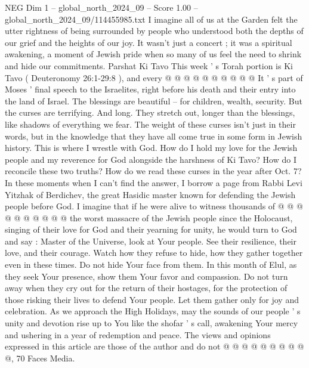 \begin{textsample}{NEG Dim 1 – global\_north\_2024\_09 – Score 1.00 – global\_north\_2024\_09/114455985.txt}
I imagine all of us at the Garden felt the utter rightness of being surrounded by people who understood both the depths of our grief and the heights of our joy.
It wasn't just a concert ; it was a spiritual awakening, a moment of Jewish pride when so many of us feel the need to shrink and hide our commitments.
Parshat Ki Tavo This week ' s Torah portion is Ki Tavo ( Deuteronomy 26:1-29:8 ), and every @ @ @ @ @ @ @ @ @ @ It ' s part of Moses ' final speech to the Israelites, right before his death and their entry into the land of Israel.
The blessings are beautiful -- for children, wealth, security.
But the curses are terrifying.
And long.
They stretch out, longer than the blessings, like shadows of everything we fear.
The weight of these curses isn't just in their words, but in the knowledge that they have all come true in some form in Jewish history.
This is where I wrestle with God.
How do I hold my love for the Jewish people and my reverence for God alongside the harshness of Ki Tavo?
How do I reconcile these two truths?
How do we read these curses in the year after Oct. 7?
In these moments when I can't find the answer, I borrow a page from Rabbi Levi Yitzhak of Berdichev, the great Hasidic master known for defending the Jewish people before God.
I imagine that if he were alive to witness thousands of @ @ @ @ @ @ @ @ @ @ the worst massacre of the Jewish people since the Holocaust, singing of their love for God and their yearning for unity, he would turn to God and say : Master of the Universe, look at Your people.
See their resilience, their love, and their courage.
Watch how they refuse to hide, how they gather together even in these times.
Do not hide Your face from them.
In this month of Elul, as they seek Your presence, show them Your favor and compassion.
Do not turn away when they cry out for the return of their hostages, for the protection of those risking their lives to defend Your people.
Let them gather only for joy and celebration.
As we approach the High Holidays, may the sounds of our people ' s unity and devotion rise up to You like the shofar ' s call, awakening Your mercy and ushering in a year of redemption and peace.
The views and opinions expressed in this article are those of the author and do not @ @ @ @ @ @ @ @ @ @, 70 Faces Media.

\end{textsample}
